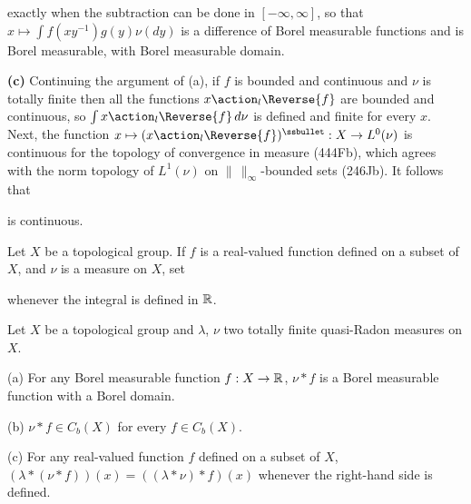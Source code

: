 {\noindent exactly when the subtraction can be done in
$[-\infty,\infty]$, so that $x\mapsto\int f(xy^{-1})g(y)\nu(dy)$ is a
difference of Borel measurable functions and is Borel measurable, with
Borel measurable domain.

\medskip

{\bf (c)} Continuing the argument of (a), if $f$ is bounded and
continuous and $\nu$ is
totally finite then all the functions $x\action_l\Reverse{f}$ are bounded
and continuous, so $\int x\action_l\Reverse{f}\,d\nu$ is defined and finite
for every $x$.   Next, the function
$x\mapsto(x\action_l\Reverse{f})^{\ssbullet}:X\to L^0(\nu)$ is
continuous for the topology of convergence in measure (444Fb), which
agrees with the norm topology of $L^1(\nu)$ on $\|\,\|_{\infty}$-bounded
sets (246Jb).   It follows that


\noindent is continuous.
}%

Let $X$ be a topological group.   If $f$ is a real-valued function
defined on a subset of $X$, and $\nu$ is a measure on $X$, set


\noindent whenever the integral is defined in $\Bbb R$.

 Let $X$ be a topological group and $\lambda$,
$\nu$ two totally finite quasi-Radon measures on $X$.

(a) For any Borel measurable function $f:X\to\Bbb R$, $\nu*f$ is a Borel
measurable function with a Borel domain.

(b) $\nu*f\in C_b(X)$ for every $f\in C_b(X)$.

(c) For any real-valued function $f$ defined on a subset of $X$,
$(\lambda*(\nu*f))(x)=((\lambda*\nu)*f)(x)$ whenever the right-hand side
is defined.


